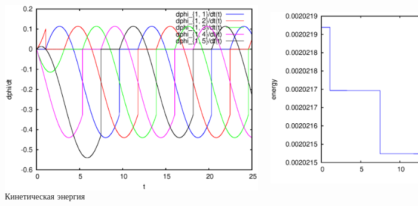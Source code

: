 \begin{figure}[H]
    \centering

    \begin{columns}
            \centering
            \includegraphics[width=\linewidth]{pic/rol__self_rot__velocities_of_rollers_of_wheel_1}
            \caption{Скорости роликов $\dot{\phi}_{ij}(t)$ на любом колесе}
            \centering
            \includegraphics[width=\linewidth]{pic/rol__self_rot__kinetic_energy}
            \caption{Кинетическая энергия}
            \centering

\end{columns}
\end{figure}
